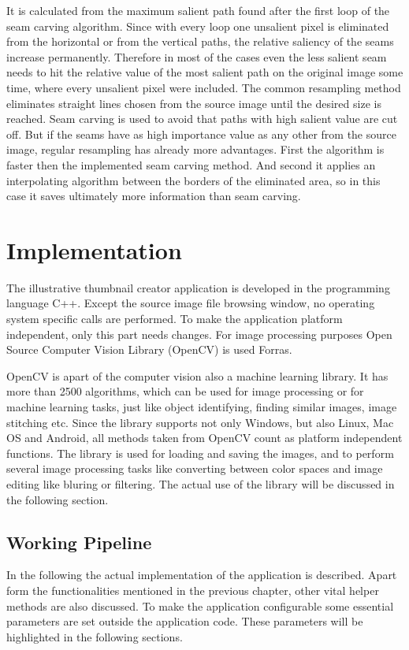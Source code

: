 \documentclass[draft,final]{vutinfth} %
\begin{document}
	It is calculated from the maximum salient path found after the first loop of the seam carving algorithm.
	Since with every loop one unsalient pixel is eliminated from the horizontal or from the vertical paths, the relative saliency of the seams increase permanently.
	Therefore in most of the cases even the less salient seam needs to hit the relative value of the most salient path on the original image some time, where every unsalient pixel were included. 
	The common resampling method eliminates straight lines chosen from the source image until the desired size is reached.
	Seam carving is used to avoid that paths with high salient value are cut off.
	But if the seams have as high importance value as any other from the source image, regular resampling has already more advantages.
	First the algorithm is faster then the implemented seam carving method.
	And second it applies an interpolating algorithm between the borders of the eliminated area, so in this case it saves ultimately more information than seam carving.   
	
	\chapter{Implementation}
	The illustrative thumbnail creator application is developed in the programming language C++.
	Except the source image file browsing window, no operating system specific calls are performed.
	To make the application platform independent, only this part needs changes.
	For image processing purposes Open Source Computer Vision Library (OpenCV) is used Forras.\par 
	OpenCV is apart of the computer vision also a machine learning library.     
	It has more than 2500 algorithms, which can be used for image processing or for machine learning tasks, just like object identifying, finding similar images, image stitching etc.
	Since the library supports not only Windows, but also Linux, Mac OS and Android, all methods taken from OpenCV count as platform independent functions.
	The library is used for loading and saving the images, and to perform several image processing tasks like converting between color spaces and image editing like bluring or filtering.
	The actual use of the library will be discussed in the following section.
	
	\section{Working Pipeline}
	In the following the actual implementation of the application is described.
	Apart form the functionalities mentioned in the previous chapter, other vital helper methods are also discussed.
	To make the application configurable some essential parameters are set outside the application code. 
	These parameters will be highlighted in the following sections.
	
\end{document}
